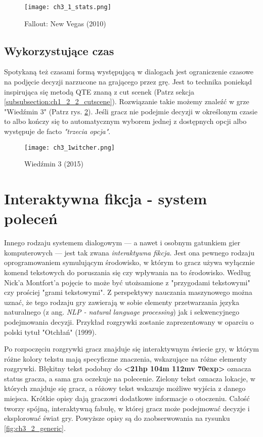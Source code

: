 \begin{figure}[h]
    \texttt{[image: ch3\_1\_stats.png]}
    \caption{Fallout: New Vegas (2010)}
    \centering
    \label{fig:ch3_1_stats}
\end{figure}

\newpage

\subsection{Wykorzystujące czas}

Spotykaną też czasami formą występującą w dialogach jest ograniczenie czasowe na podjęcie decyzji
narzucone na grającego przez grę. Jest to technika poniekąd inspirująca się metodą QTE znaną z
cut scenek (Patrz sekcja \ref{subsubsection:ch1_2_2_cutscene}). Rozwiązanie takie możemy znaleźć
w grze "Wiedźmin 3" (Patrz rys. \ref{fig:ch3_1_time}). Jeśli gracz nie podejmie decyzji w
określonym czasie to albo kończy się to automatycznym wyborem jednej z dostępnych opcji albo
występuje de facto \textit{"trzecia opcja"}.

\begin{figure}[h]
    \texttt{[image: ch3\_1witcher.png]}
    \caption{Wiedźmin 3 (2015)}
    \centering
    \label{fig:ch3_1_time}
\end{figure}

\section{Interaktywna fikcja - system poleceń}\label{subsection:ch3_2}

Innego rodzaju systemem dialogowym --- a nawet i osobnym gatunkiem gier komputerowych --- jest
tak zwana \textit{interaktywna fikcja}. Jest ona pewnego rodzaju oprogramowaniem symulującym
środowisko, w którym to gracz używa wyłącznie komend tekstowych do poruszania się czy wpływania
na to środowisko\cite{if_wiki}. Według Nick'a Montfort'a pojęcie to może być utożsamione z
"przygodami tekstowymi" czy prościej "grami tekstowymi"\cite{IF_4th_era}. Z perspektywy nauczania
maszynowego można uznać, że tego rodzaju gry zawierają w sobie elementy przetwarzania języka
naturalnego (z ang. \textit{NLP - natural language processing}) jak i sekwencyjnego podejmowania
decyzji\cite{hausknecht2020interactive}. Przykład rozgrywki zostanie zaprezentowany w oparciu
o polski tytuł "Otchłań" (1999).

Po rozpoczęciu rozgrywki gracz znajduje się interaktywnym świecie gry, w którym różne kolory tekstu
mają specyficzne znaczenia, wskazujące na różne elementy rozgrywki. Błękitny tekst podobny do
\textbf{<21hp 104m 112mv 70exp>} oznacza status gracza, a sama gra oczekuje na polecenie.
Zielony tekst oznacza lokacje, w których znajduje się gracz, a różowy tekst wskazuje możliwe
wyjścia z danego miejsca. Krótkie opisy dają graczowi dodatkowe informacje o otoczeniu. Całość
tworzy spójną, interaktywną fabułę, w której gracz może podejmować decyzje i eksplorować świat gry.
Powyższe opisy są do zaobserwowania na rysunku \ref{fig:ch3_2_generic}.

